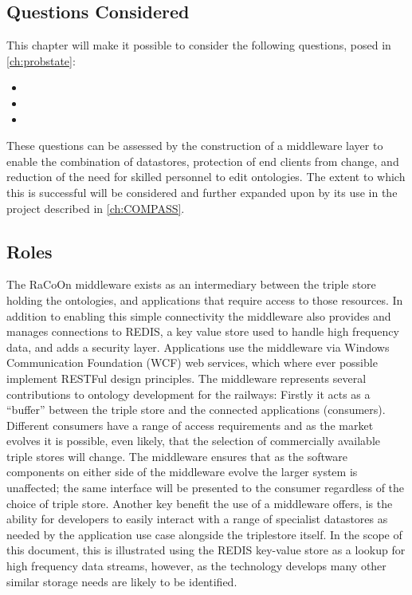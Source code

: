 \subsection{Questions Considered}

This chapter will make it possible to consider the following questions, posed in \autoref{ch:probstate}:
\begin{itemize}
\item \QuestionCombine
\item \QuestionChange
\item \QuestionSkillz
\end{itemize}

These questions can be assessed by the construction of a middleware layer to enable the combination of datastores, protection of end clients from change, and reduction of the need for skilled personnel to edit ontologies. The extent to which this is successful will be considered and further expanded upon by its use in the project described in \autoref{ch:COMPASS}.

\subsection{Roles}
The RaCoOn middleware exists as an intermediary between the triple store holding the ontologies, and applications that require access to those resources. In addition to enabling this simple connectivity the middleware also provides and manages connections to REDIS, a key value store used to handle high frequency data, and adds a security layer. Applications use the middleware via Windows Communication Foundation (WCF) web services, which where ever possible implement RESTFul design principles. The middleware represents several contributions to ontology development for the railways: Firstly it acts as a \enquote{buffer} between the triple store and the connected applications (consumers). Different consumers have a range of access requirements and as the market evolves it is possible, even likely, that the selection of commercially available triple stores will change. The middleware ensures that as the software components on either side of the middleware evolve the larger system is unaffected; the same interface will be presented to the consumer regardless of the choice of triple store. Another key benefit the use of a middleware offers, is the ability for developers to easily interact with a range of specialist datastores as needed by the application use case alongside the triplestore itself. In the scope of this document, this is illustrated using the REDIS key-value store as a lookup for high frequency data streams, however, as the technology develops many other similar storage needs are likely to be identified.

